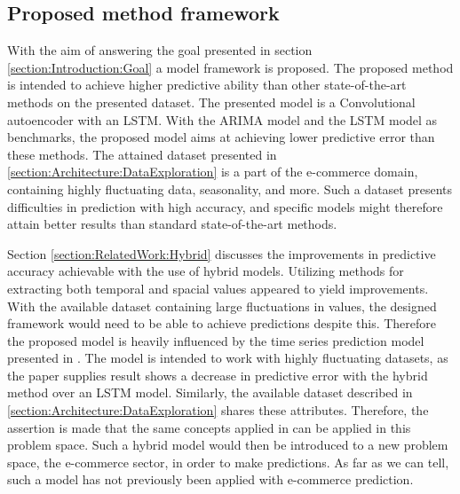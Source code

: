 \subsection{Proposed method framework}


With the aim of answering the goal presented in section \ref{section:Introduction:Goal} a model framework is proposed.
The proposed method is intended to achieve higher predictive ability than other state-of-the-art methods on the presented dataset.
The presented model is a Convolutional autoencoder with an LSTM.
With the ARIMA model and the LSTM model as benchmarks, the proposed model aims at achieving lower predictive error than these methods.
The attained dataset presented in
\autoref{section:Architecture:DataExploration}
is a part of the e-commerce domain, containing highly fluctuating data, seasonality, and more.
Such a dataset presents difficulties in prediction with high accuracy, and specific models might therefore attain better results than standard state-of-the-art methods.

Section \ref{section:RelatedWork:Hybrid} discusses the improvements in predictive accuracy achievable with the use of hybrid models.
Utilizing methods for extracting both temporal and spacial values appeared to yield improvements.
With the available dataset containing large fluctuations in values, the designed framework would need to be able to achieve predictions despite this.
Therefore the proposed model is heavily influenced by the time series prediction model presented in \cite{Zhao2019}.
The model is intended to work with highly fluctuating datasets, as the paper supplies result shows a decrease in predictive error with the hybrid method over an LSTM model.
Similarly, the available dataset described in
\autoref{section:Architecture:DataExploration} shares these attributes.
Therefore, the assertion is made that the same concepts applied in \cite{Zhao2019} can be applied in this problem space.
Such a hybrid model would then be introduced to a new problem space, the e-commerce sector, in order to make predictions.
As far as we can tell, such a model has not previously been applied with e-commerce prediction.

